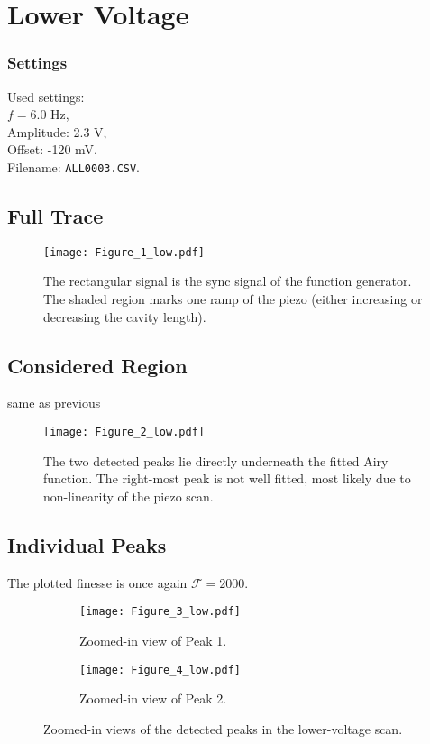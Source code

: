 \section{Lower Voltage}
\subsubsection*{Settings}
Used settings:  \\
$f = 6.0$ Hz,  \\
Amplitude: 2.3 V,  \\
Offset: -120 mV.  \\
Filename: \texttt{ALL0003.CSV}.  

\subsection{Full Trace}

\begin{figure}[H]
    \centering
    \texttt{[image: Figure\_1\_low.pdf]}
    \caption{The rectangular signal is the sync signal of the function generator. The shaded region marks one ramp of the piezo (either increasing or decreasing the cavity length).}
    \label{fig:full_low}
\end{figure}

\subsection{Considered Region}
same as previous
\begin{figure}[H]
    \centering
    \texttt{[image: Figure\_2\_low.pdf]}
    \caption{The two detected peaks lie directly underneath the fitted Airy function. The right-most peak is not well fitted, most likely due to non-linearity of the piezo scan.}
    \label{fig:fit_low}
\end{figure}

\newpage
\subsection{Individual Peaks}
The plotted finesse is once again $\mathcal{F}=2000$.

\begin{figure}[H]
    \centering
    \begin{subfigure}[t]{0.48\textwidth}
        \centering
        \texttt{[image: Figure\_3\_low.pdf]}
        \caption{Zoomed-in view of Peak 1.}
        \label{fig:peak1_low}
    \end{subfigure}
    \hfill
    \begin{subfigure}[t]{0.48\textwidth}
        \centering
        \texttt{[image: Figure\_4\_low.pdf]}
        \caption{Zoomed-in view of Peak 2.}
        \label{fig:peak2_low}
    \end{subfigure}
    \caption{Zoomed-in views of the detected peaks in the lower-voltage scan.}
\end{figure}
